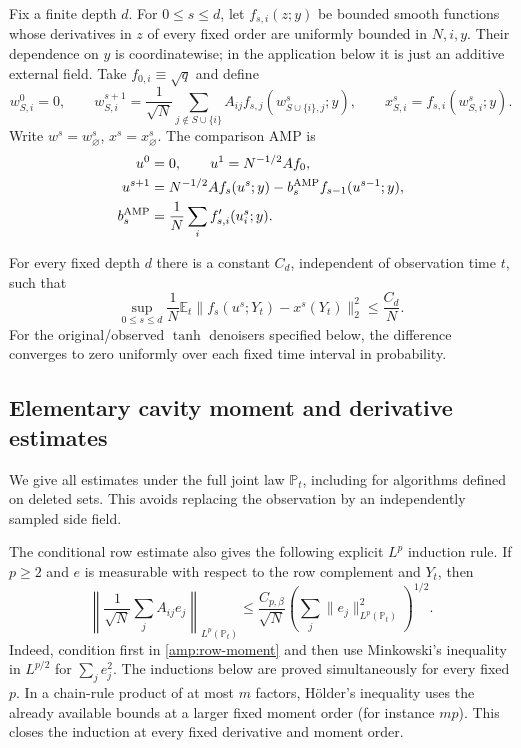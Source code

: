 \documentclass[11pt,reqno]{amsart}
\begin{document}
Fix a finite depth $d$.  For $0\le s\le d$, let $f_{s,i}(z;y)$ be bounded
smooth functions whose derivatives in $z$ of every fixed order are
uniformly bounded in $N,i,y$.  Their dependence on $y$ is coordinatewise;
in the application below it is just an additive external field.
Take $f_{0,i}\equiv\sqrt q$ and define
\[
 w^0_{S,i}=0,\qquad
 w^{s+1}_{S,i}=\frac1{\sqrt N}
       \sum_{j\notin S\cup\{i\}} A_{ij}
          f_{s,j}(w^s_{S\cup\{i\},j};y),\qquad
 x^s_{S,i}=f_{s,i}(w^s_{S,i};y).
\]
Write $w^s=w^s_\varnothing$, $x^s=x^s_\varnothing$.
The comparison AMP is
\begin{align*}
 u^0&=0,\qquad u^1=N^{-1/2}A f_0,\\
 u^{s+1}&=N^{-1/2}A f_s(u^s;y)
      -b_s^{\rm AMP}f_{s-1}(u^{s-1};y),\\
 b_s^{\rm AMP}&=\frac1N\sum_i f'_{s,i}(u_i^s;y).
\end{align*}

\begin{prop}\label{amp:cavity-comparison}
For every fixed depth $d$ there is a constant $C_d$, independent of
observation time $t$, such that
\[
 \sup_{0\le s\le d}\frac1N
  \mathbb E_t\|f_s(u^s;Y_t)-x^s(Y_t)\|_2^2\le\frac{C_d}{N}.
\]
For the original/observed $\tanh$ denoisers specified below, the difference
converges to zero uniformly over each fixed time interval in probability.
\end{prop}

\subsection{Elementary cavity moment and derivative estimates}

We give all estimates under the full joint law $\mathbb P_t$, including
for algorithms defined on deleted sets.  This avoids replacing the
observation by an independently sampled side field.

The conditional row estimate also
gives the following explicit $L^p$ induction rule. If $p\ge2$ and $e$ is
measurable with respect to the row complement and $Y_t$, then
\[
 \left\|\frac1{\sqrt N}\sum_j A_{ij}e_j\right\|_{L^p(\mathbb P_t)}
 \le\frac{C_{p,\beta}}{\sqrt N}
       \left(\sum_j\|e_j\|_{L^p(\mathbb P_t)}^2\right)^{1/2}.
\]
Indeed, condition first in \eqref{amp:row-moment} and then use
Minkowski's inequality in $L^{p/2}$ for $\sum_j e_j^2$.
The inductions below are proved simultaneously for every fixed $p$.
In a chain-rule product of at most $m$ factors, H\"older's inequality
uses the already available bounds at a larger fixed moment order
(for instance $mp$). This closes the induction at every fixed derivative
and moment order.
\end{document}
